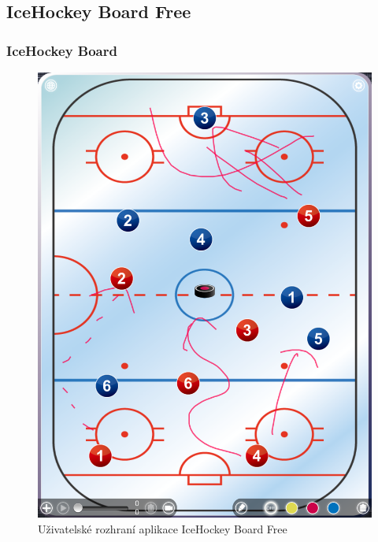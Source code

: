 \documentclass{beamer}
\begin{document}
\subsection{IceHockey Board Free}
\begin{frame}
\frametitle{IceHockey Board}

  \begin{figure}[H]
    \includegraphics[height=.6\textheight]{img/IMG_0018}
    \caption{Uživatelské rozhraní aplikace IceHockey Board Free}
    \label{pic:icehockeyboardfree}
  \end{figure}

\end{frame}
\end{document}
